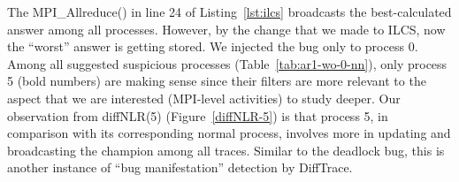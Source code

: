 The MPI\_Allreduce() in line 24 of Listing~\ref{lst:ilcs} broadcasts the best-calculated answer among all processes.
%
However, by the change that we made to ILCS, now the ``worst'' answer is getting stored.
%
We injected the bug only to process 0.
%
Among all suggested suspicious processes (Table~\ref{tab:ar1-wo-0-nn}), only process 5 (bold numbers) are making sense since their filters are more relevant to the aspect that we are interested (MPI-level activities) to study deeper.
%
Our observation from diffNLR(5) (Figure~\ref{diffNLR-5}) is that process 5, in comparison with its corresponding normal process, involves more in updating and broadcasting the champion among all traces.
%
Similar to the deadlock bug, this is another instance of  ``bug manifestation'' detection by DiffTrace.





